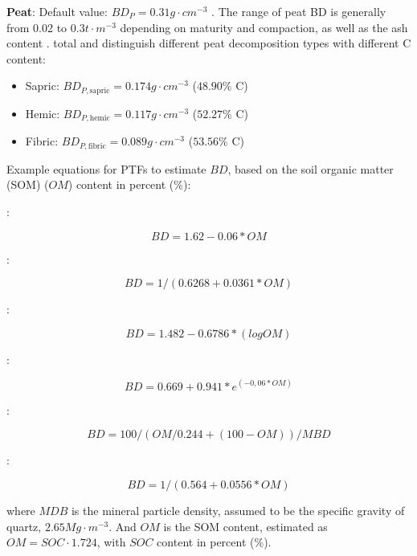 \documentclass[10pt,b5paper,]{book}
\theoremstyle{definition}
\theoremstyle{definition}
\theoremstyle{definition}
\theoremstyle{remark}
\begin{document}
\textbf{Peat}: Default value: \(BD_{P} = 0.31 g \cdot cm^{-3}\)
\citet{batjes1996}. The range of peat BD is generally from 0.02 to
0.3\(t \cdot m^{-3}\) depending on maturity and compaction, as well as
the ash content \citep{agus_measuring_2011}. total and
\citet{agus_measuring_2011} distinguish different peat decomposition
types with different C content:

\begin{itemize}
\item
  Sapric: \(BD_{P,\text{sapric}} = 0.174 g \cdot cm^{-3}\) (\(48.90\%\)
  C)
\item
  Hemic: \(BD_{P,\text{hemic}} = 0.117 g \cdot cm^{-3}\) (\(52.27\%\) C)
\item
  Fibric: \(BD_{P,\text{fibric}} = 0.089 g \cdot cm^{-3}\) (\(53.56\%\)
  C)
\end{itemize}

Example equations for PTFs to estimate \(BD\), based on the soil organic
matter (SOM) (\(OM\)) content in percent (\%):

\cite{saini_1966_organic}:

\begin{equation}
BD = 1.62-0.06 * OM
\end{equation}

\cite{Drew1973}:

\begin{equation}
BD = 1/(0.6268 + 0.0361 * OM)
\end{equation}

\cite{jeffrey1970note}:

\begin{equation}
BD = 1.482 - 0.6786 * (log OM)
\end{equation}

\cite{Grigal1989}:

\begin{equation}
BD = 0.669 + 0.941 * e^{(-0,06 * OM)}
\end{equation}

\cite{adams1973effect}:

\begin{equation}
BD = 100/(OM/0.244 + (100-OM))/MBD
\end{equation}

\cite{honeysett1989use}:

\begin{equation}
BD = 1/(0.564 + 0.0556*OM)
\end{equation}

where \(MDB\) is the mineral particle density, assumed to be the
specific gravity of quartz, \(2.65 Mg \cdot m^{-3}\). And \(OM\) is the
SOM content, estimated as \(OM = SOC \cdot 1.724\), with \(SOC\) content
in percent (\%).
\end{document}
